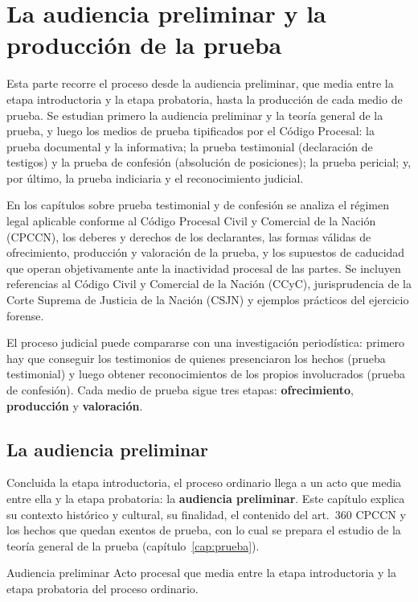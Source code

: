 \documentclass[12pt,oneside]{book}
\begin{document}
\part{La audiencia preliminar y la producción de la prueba}\label{pt:prueba}
Esta parte recorre el proceso desde la audiencia preliminar, que media entre la etapa introductoria y la etapa probatoria, hasta la producción de cada medio de prueba. Se estudian primero la audiencia preliminar y la teoría general de la prueba, y luego los medios de prueba tipificados por el Código Procesal: la prueba documental y la informativa; la prueba testimonial (declaración de testigos) y la prueba de confesión (absolución de posiciones); la prueba pericial; y, por último, la prueba indiciaria y el reconocimiento judicial.

En los capítulos sobre prueba testimonial y de confesión se analiza el régimen legal aplicable conforme al Código Procesal Civil y Comercial de la Nación (CPCCN), los deberes y derechos de los declarantes, las formas válidas de ofrecimiento, producción y valoración de la prueba, y los supuestos de caducidad que operan objetivamente ante la inactividad procesal de las partes. Se incluyen referencias al Código Civil y Comercial de la Nación (CCyC), jurisprudencia de la Corte Suprema de Justicia de la Nación (CSJN) y ejemplos prácticos del ejercicio forense.

El proceso judicial puede compararse con una investigación periodística: primero hay que conseguir los testimonios de quienes presenciaron los hechos (prueba testimonial) y luego obtener reconocimientos de los propios involucrados (prueba de confesión). Cada medio de prueba sigue tres etapas: \textbf{ofrecimiento}, \textbf{producción} y \textbf{valoración}.


\chapter{La audiencia preliminar}
\label{cap:audiencia}

Concluida la etapa introductoria, el proceso ordinario llega a un acto que media entre ella y la etapa probatoria: la \textbf{audiencia preliminar}. Este capítulo explica su contexto histórico y cultural, su finalidad, el contenido del art.~360 CPCCN y los hechos que quedan exentos de prueba, con lo cual se prepara el estudio de la teoría general de la prueba (capítulo~\ref{cap:prueba}).

\begin{definition}{Audiencia preliminar}
Acto procesal que media entre la etapa introductoria y la etapa probatoria del proceso ordinario.
\end{definition}
\end{document}
